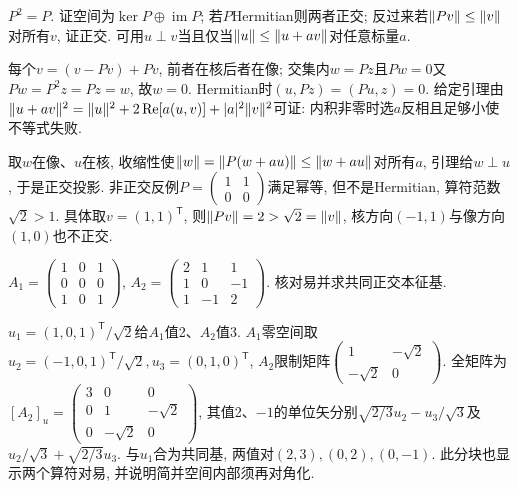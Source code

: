 \begin{exercise}
$P^2=P$. 证空间为$\ker P\oplus\operatorname{im}P$; 若$P$Hermitian则两者正交; 反过来若$\lVert Pv\rVert\le\lVert v\rVert$对所有$v$, 证正交. 可用$u\perp v$当且仅当$\lVert u\rVert\le\lVert u+av\rVert$对任意标量$a$.
\end{exercise}
\begin{solution}
每个$v=(v-Pv)+Pv$, 前者在核后者在像; 交集内$w=Pz$且$Pw=0$又$Pw=P^2z=Pz=w$, 故$w=0$. Hermitian时$(u,Pz)=(Pu,z)=0$. 给定引理由$\lVert u+av\rVert^2=\lVert u\rVert^2+2\operatorname{Re}[a(u,v)]+|a|^2\lVert v\rVert^2$可证: 内积非零时选$a$反相且足够小使不等式失败.

取$w$在像、$u$在核, 收缩性使$\lVert w\rVert=\lVert P(w+au)\rVert\le\lVert w+au\rVert$对所有$a$, 引理给$w\perp u$, 于是正交投影. 非正交反例$P=\begin{pmatrix}1&1\\0&0\end{pmatrix}$满足幂等, 但不是Hermitian, 算符范数$\sqrt2>1$. 具体取$v=(1,1)^{\mathsf T}$, 则$\lVert Pv\rVert=2>\sqrt2=\lVert v\rVert$, 核方向$(-1,1)$与像方向$(1,0)$也不正交.
\end{solution}
\begin{exercise}
$A_1=\begin{pmatrix}1&0&1\\0&0&0\\1&0&1\end{pmatrix}$,
$A_2=\begin{pmatrix}2&1&1\\1&0&-1\\1&-1&2\end{pmatrix}$. 核对易并求共同正交本征基.
\end{exercise}
\begin{solution}
$u_1=(1,0,1)^{\mathsf T}/\sqrt2$给$A_1$值2、$A_2$值3. $A_1$零空间取$u_2=(-1,0,1)^{\mathsf T}/\sqrt2,u_3=(0,1,0)^{\mathsf T}$, $A_2$限制矩阵$\begin{pmatrix}1&-\sqrt2\\-\sqrt2&0\end{pmatrix}$. 全矩阵为$[A_2]_u=\begin{pmatrix}3&0&0\\0&1&-\sqrt2\\0&-\sqrt2&0\end{pmatrix}$, 其值2、$-1$的单位矢分别$\sqrt{2/3}u_2-u_3/\sqrt3$及$u_2/\sqrt3+\sqrt{2/3}u_3$. 与$u_1$合为共同基, 两值对$(2,3),(0,2),(0,-1)$. 此分块也显示两个算符对易, 并说明简并空间内部须再对角化.
\end{solution}
